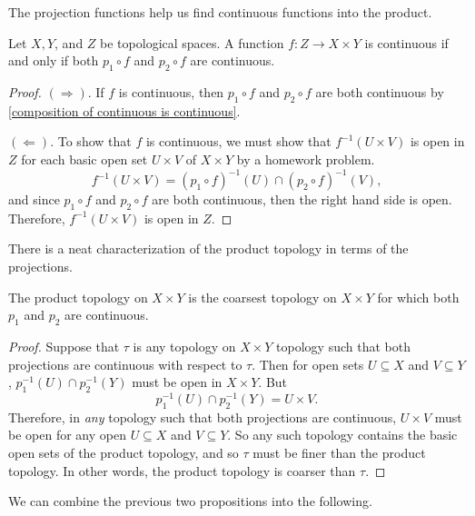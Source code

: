 \documentclass[noname]{notes}
\begin{document}
The projection functions help us find continuous functions into the product. 

\begin{proposition}
	Let $X, Y$, and $Z$ be topological spaces. A function $f \colon Z \to X \times Y$ is continuous if and only if both $p_1 \circ f$ and $p_2 \circ f$ are continuous. 
\end{proposition}

\begin{proof}
	$(\Longrightarrow)$. If $f$ is continuous, then $p_1 \circ f$ and $p_2 \circ f$ are both continuous by \cref{composition of continuous is continuous}.
	
	$(\Longleftarrow)$. To show that $f$ is continuous, we must show that $f^{-1}(U \times V)$ is open in $Z$ for each basic open set $U \times V$ of $X \times Y$ by a homework problem. 
	\[
		f^{-1}(U \times V) = (p_1 \circ f)^{-1}(U) \cap (p_2 \circ f)^{-1}(V), 
	\]
	and since $p_1 \circ f$ and $p_2 \circ f$ are both continuous, then the right hand side is open. Therefore, $f^{-1}(U \times V)$ is open in $Z$. 
\end{proof}

There is a neat characterization of the product topology in terms of the projections. 

\begin{proposition}
	The product topology on $X \times Y$ is the coarsest topology on $X \times Y$ for which both $p_1$ and $p_2$ are continuous. 
\end{proposition}

\begin{proof}
	Suppose that $\tau$ is any topology on $X \times Y$ topology such that both projections are continuous with respect to $\tau$. Then for open sets $U \subseteq X$ and $V \subseteq Y$, $p_1^{-1}(U) \cap p_2^{-1}(Y)$ must be open in $X \times Y$. But 
	\[
		p_1^{-1}(U) \cap p_2^{-1}(Y) = U \times V. 
	\]	
	Therefore, in \emph{any} topology such that both projections are continuous, $U \times V$ must be open for any open $U \subseteq X$ and $V \subseteq Y$. So any such topology contains the basic open sets of the product topology, and so $\tau$ must be finer than the product topology. In other words, the product topology is coarser than $\tau$. 
\end{proof}

We can combine the previous two propositions into the following.  
\end{document}
